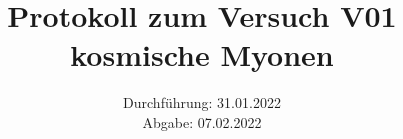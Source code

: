 \titlehead{\texttt{[image: resources/logo.jpg]}}
\title{Protokoll zum Versuch  V01\\ kosmische Myonen }
\date{Durchführung: 31.01.2022 \\ Abgabe: 07.02.2022 }

